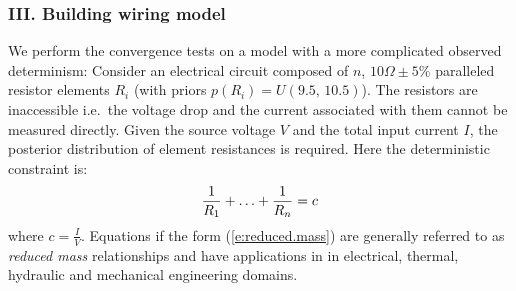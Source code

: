 \documentclass[]{article}
\newcommand{\pr}{p}
\begin{document}

  
%



\subsubsection*{III. Building wiring model} 
We perform the convergence tests on a model with a more complicated observed determinism: 
Consider an electrical circuit composed of $n$, $10\Omega\pm5\%$ paralleled resistor elements $R_i$
(with priors $\pr(R_i) = U(9.5, \, 10.5)$).
The resistors are inaccessible i.e.\ the voltage drop and the current associated with them cannot be measured directly.
Given the source voltage $V$ and the total input current $I$, the posterior distribution of element resistances is required.
Here the deterministic constraint is:
\begin{equation} \footnotesize 
\label{e:reduced.mass}
 \frac{1}{R_1} + \ldots + \frac{1}{R_n} = c
\end{equation}
where $c = \frac{I}{V}$.
Equations if the form (\ref{e:reduced.mass}) are generally referred to as \emph{reduced mass} relationships and 
have applications in in electrical, thermal, hydraulic and mechanical engineering domains.
\end{document}
